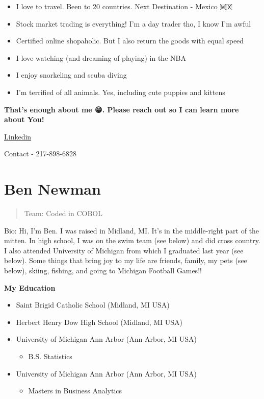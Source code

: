 \documentclass[
]{book}
\providecommand{\tightlist}{%
  \setlength{\itemsep}{0pt}\setlength{\parskip}{0pt}}
\begin{document}
\begin{itemize}
\tightlist
\item
  I love to travel. Been to 20 countries. Next Destination - Mexico 🇲🇽
\item
  Stock market trading is everything! I'm a day trader tho, I know I'm awful 🤭
\item
  Certified online shopaholic. But I also return the goods with equal speed
\item
  I love watching (and dreaming of playing) in the NBA
\item
  I enjoy snorkeling and scuba diving
\item
  I'm terrified of all animals. Yes, including cute puppies and kittens 🤯
\end{itemize}

\textbf{That's enough about me 😁. Please reach out so I can learn more about You!}

\href{https://www.linkedin.com/in/nikita-mamidi-763b80185/}{Linkedin}

Contact - 217-898-6828

\hypertarget{ben-newman}{%
\section{Ben Newman}\label{ben-newman}}

\begin{quote}
Team: Coded in COBOL
\end{quote}

Bio: Hi, I'm Ben. I was raised in Midland, MI. It's in the middle-right part of the mitten. In high school, I was on the swim team (see below) and did cross country. I also attended University of Michigan from which I graduated last year (see below). Some things that bring joy to my life are friends, family, my pets (see below), skiing, fishing, and going to Michigan Football Games!!

\textbf{My Education}

\begin{itemize}
\tightlist
\item
  Saint Brigid Catholic School (Midland, MI USA)
\item
  Herbert Henry Dow High School (Midland, MI USA)
\item
  University of Michigan Ann Arbor (Ann Arbor, MI USA)

  \begin{itemize}
  \tightlist
  \item
    B.S. Statistics
  \end{itemize}
\item
  University of Michigan Ann Arbor (Ann Arbor, MI USA)

  \begin{itemize}
  \tightlist
  \item
    Masters in Business Analytics
  \end{itemize}
\end{itemize}
\end{document}
